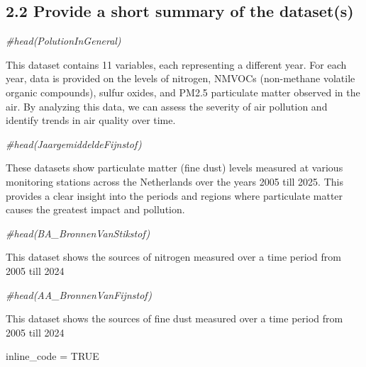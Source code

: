 \documentclass[
]{article}
\newenvironment{Shaded}{\begin{snugshade}}{\end{snugshade}}
\newcommand{\CommentTok}[1]{\textcolor[rgb]{0.56,0.35,0.01}{\textit{#1}}}
\newcommand{\ConstantTok}[1]{\textcolor[rgb]{0.56,0.35,0.01}{#1}}
\newcommand{\NormalTok}[1]{#1}
\newcommand{\OtherTok}[1]{\textcolor[rgb]{0.56,0.35,0.01}{#1}}
\begin{document}
\subsection{2.2 Provide a short summary of the
dataset(s)}\label{provide-a-short-summary-of-the-datasets}

\begin{Shaded}
\begin{Highlighting}[]
\CommentTok{\#head(PolutionInGeneral)}
\end{Highlighting}
\end{Shaded}

This dataset contains 11 variables, each representing a different year.
For each year, data is provided on the levels of nitrogen, NMVOCs
(non-methane volatile organic compounds), sulfur oxides, and PM2.5
particulate matter observed in the air. By analyzing this data, we can
assess the severity of air pollution and identify trends in air quality
over time.

\begin{Shaded}
\begin{Highlighting}[]
\CommentTok{\#head(JaargemiddeldeFijnstof)}
\end{Highlighting}
\end{Shaded}

These datasets show particulate matter (fine dust) levels measured at
various monitoring stations across the Netherlands over the years 2005
till 2025. This provides a clear insight into the periods and regions
where particulate matter causes the greatest impact and pollution.

\begin{Shaded}
\begin{Highlighting}[]
\CommentTok{\#head(BA\_BronnenVanStikstof)}
\end{Highlighting}
\end{Shaded}

This dataset shows the sources of nitrogen measured over a time period
from 2005 till 2024

\begin{Shaded}
\begin{Highlighting}[]
\CommentTok{\#head(AA\_BronnenVanFijnstof)}
\end{Highlighting}
\end{Shaded}

This dataset shows the sources of fine dust measured over a time period
from 2005 till 2024

\begin{Shaded}
\begin{Highlighting}[]
\NormalTok{inline\_code }\OtherTok{=} \ConstantTok{TRUE}
\end{Highlighting}
\end{Shaded}
\end{document}
